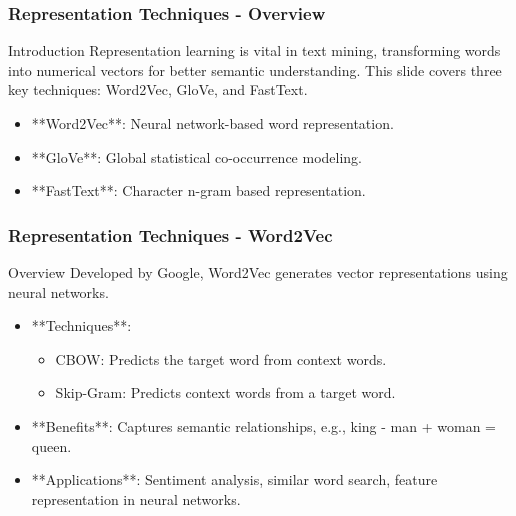 \documentclass[aspectratio=169]{beamer}
\begin{document}
\begin{frame}[fragile]
    \frametitle{Representation Techniques - Overview}
    \begin{block}{Introduction}
        Representation learning is vital in text mining, transforming words into numerical vectors for better semantic understanding. This slide covers three key techniques: Word2Vec, GloVe, and FastText.
    \end{block}
    \begin{itemize}
        \item **Word2Vec**: Neural network-based word representation.
        \item **GloVe**: Global statistical co-occurrence modeling.
        \item **FastText**: Character n-gram based representation.
    \end{itemize}
\end{frame}

\begin{frame}[fragile]
    \frametitle{Representation Techniques - Word2Vec}
    \begin{block}{Overview}
        Developed by Google, Word2Vec generates vector representations using neural networks.
    \end{block}
    \begin{itemize}
        \item **Techniques**:
            \begin{itemize}
                \item CBOW: Predicts the target word from context words.
                \item Skip-Gram: Predicts context words from a target word.
            \end{itemize}
        \item **Benefits**: Captures semantic relationships, e.g., king - man + woman = queen.
        \item **Applications**: Sentiment analysis, similar word search, feature representation in neural networks.
    \end{itemize}
\end{frame}
\end{document}
